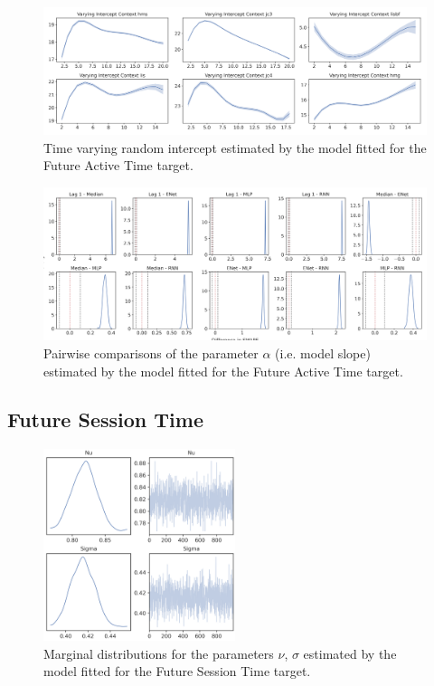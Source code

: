 \begin{figure}[ht]
\centering
\includegraphics[width=\textwidth]{images/appendix_C/Future Active Time_interc_2.png}
\caption[\textbf{Future active time time-varying random intercept}]{Time varying random intercept estimated by the model fitted for the Future Active Time target.}
\label{interc_act_2}
\end{figure}
\FloatBarrier

\begin{figure}[ht]
\centering
\includegraphics[width=\textwidth]{images/appendix_C/Future_Active_Time_comp_2.png}
\caption[\textbf{Future active time pairwise comparisons of model fixed effect}]{Pairwise comparisons of the parameter $\alpha$ (i.e. model slope) estimated by the model fitted for the Future Active Time target.}
\label{comp_act_2}
\end{figure}
\FloatBarrier

\subsection{Future Session Time}
\label{future_sess_bayes_2}

\begin{figure}[ht]
\centering
\includegraphics[width=0.5\textwidth]{images/appendix_C/Future Session Time_marginals_2.png}
\caption[\textbf{Future session time marginal distributions}]{Marginal distributions for the parameters $\nu$, $\sigma$ estimated by the model fitted for the Future Session Time target.}
\label{marginals_sess_2}
\end{figure}
\FloatBarrier

